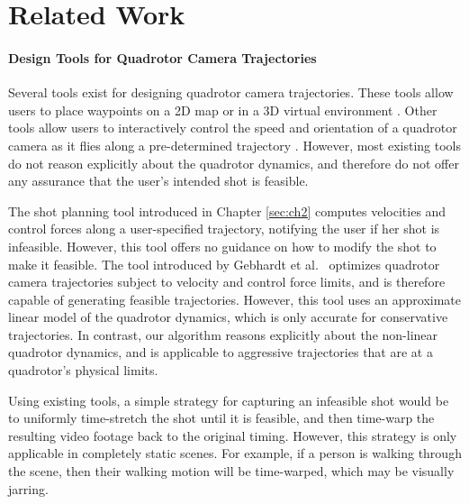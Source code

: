 \section{Related Work}

\paragraph{Design Tools for Quadrotor Camera Trajectories}

Several tools exist for designing quadrotor camera trajectories.
These tools allow users to place waypoints on a 2D map \cite{apm:2015,dji:2015} or in a 3D virtual environment \cite{meier:2012,joubert:2015,gebhardt:2016}.
Other tools allow users to interactively control the speed and orientation of a quadrotor camera as it flies along a pre-determined trajectory \cite{3drobotics:2015,dji:2015a,joubert:2015}. 
However, most existing tools do not reason explicitly about the quadrotor dynamics, and therefore do not offer any assurance that the user's intended shot is feasible.


The shot planning tool introduced in Chapter \ref{sec:ch2} computes velocities and control forces along a user-specified trajectory, notifying the user if her shot is infeasible. However, this tool offers no guidance on how to modify the shot to make it feasible.
The tool introduced by Gebhardt et al.~ optimizes quadrotor camera trajectories subject to velocity and control force limits, and is therefore capable of generating feasible trajectories.
However, this tool uses an approximate linear model of the quadrotor dynamics, which is only accurate for conservative trajectories.
In contrast, our algorithm reasons explicitly about the non-linear quadrotor dynamics, and is applicable to aggressive trajectories that are at a quadrotor's physical limits.

Using existing tools, a simple strategy for capturing an infeasible shot would be to uniformly time-stretch the shot until it is feasible, and then time-warp the resulting video footage back to the original timing.
However, this strategy is only applicable in completely static scenes.
For example, if a person is walking through the scene, then their walking motion will be time-warped, which may be visually jarring.


